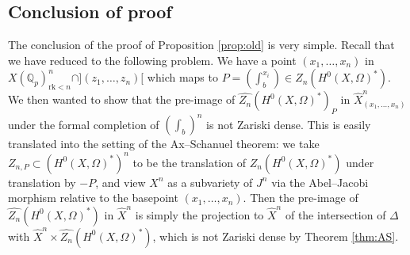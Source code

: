 \documentclass{amsart}
\def\Q{\mathbb Q}
\newcommand{\rk}{\mathrm{rk}}
\theoremstyle{plain}
\theoremstyle{definition}
\newcommand{\red}{\mathrm{red}}
\newcommand{\F}{\mathbb{F}}
\begin{document}
\subsection{Conclusion of proof}
The conclusion of the proof of Proposition \ref{prop:old} is very simple. Recall that we have reduced to the following problem. We have a point $(x_1 ,\ldots ,x_n )$ in $X(\Q _p )^n _{\rk <n }\cap ](z_1 ,\ldots ,z_n )[$ which maps to $P=(\int ^{x_i }_b )\in Z_n (H^0 (X,\Omega )^* )$. We then wanted to show that the pre-image of $\widehat{Z_n }(H^0 (X,\Omega )^* )_P$ in $\widehat{X}^n _{(x_1 ,\ldots ,x_n )}$ under the formal completion of $(\int _b )^n $ is not Zariski dense. This is easily translated into the setting of the Ax--Schanuel theorem: we take $Z_{n,P}\subset (H^0 (X,\Omega )^* )^n $ to be the translation of $Z_n (H^0 (X,\Omega )^* )$ under translation by $-P$, and view $X^n $ as a subvariety of $J^n $ via the Abel--Jacobi morphism relative to the basepoint $(x_1 ,\ldots ,x_n )$. Then the pre-image of $\widehat{Z_n }(H^0 (X,\Omega )^* )$ in $\widehat{X}^n $ is simply the projection to $\widehat{X}^n$ of the intersection of $\Delta $ with $\widehat{X}^n \times \widehat{Z_n } (H^0 (X,\Omega )^* )$, which is not Zariski dense by Theorem \ref{thm:AS}.
%
%
%
%
\end{document}
